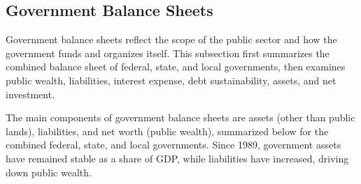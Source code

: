 \begin{minipage}{0.76\textwidth}
\vspace*{-5mm}

\vspace*{-2mm}
		
\end{minipage}
\newpage


\hypertarget{govbs}{\label{govbs}}
\subsection*{Government Balance Sheets}
\begin{minipage}{0.76\textwidth}
   

\small Government balance sheets reflect the scope of the public sector and how the government funds and organizes itself. This subsection first summarizes the combined balance sheet of federal, state, and local governments, then examines public wealth, liabilities, interest expense, debt sustainability, assets, and net investment. 

The main components of government balance sheets are assets (other than public lands), liabilities, and net worth (public wealth), summarized below for the combined federal, state, and local governments. Since 1989, government assets have remained stable as a share of GDP, while liabilities have increased, driving down public wealth. 
\end{minipage}
\vspace{0.5mm}


